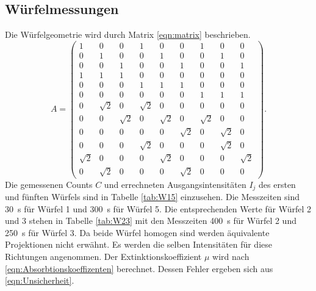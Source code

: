 \subsection{Würfelmessungen}
Die Würfelgeometrie wird durch Matrix \eqref{eqn:matrix} beschrieben.
\begin{equation*}
    A = \begin{pmatrix}
               1 & 0 & 0 & 1 & 0 & 0 & 1 & 0 & 0 \\
               0 & 1 & 0 & 0 & 1 & 0 & 0 & 1 & 0 \\
               0 & 0 & 1 & 0 & 0 & 1 & 0 & 0 & 1 \\
               1 & 1 & 1 & 0 & 0 & 0 & 0 & 0 & 0 \\
               0 & 0 & 0 & 1 & 1 & 1 & 0 & 0 & 0 \\
               0 & 0 & 0 & 0 & 0 & 0 & 1 & 1 & 1 \\
               0 & \sqrt{2} & 0 & \sqrt{2} & 0 & 0 & 0 & 0 & 0 \\
               0 & 0 & \sqrt{2} & 0 & \sqrt{2} & 0 & \sqrt{2} & 0 & 0 \\
               0 & 0 & 0 & 0 & 0 & \sqrt{2} & 0 & \sqrt{2} & 0 \\
               0 & 0 & 0 & \sqrt{2} & 0 & 0 & 0 & \sqrt{2} & 0 \\
               \sqrt{2} & 0 & 0 & 0 & \sqrt{2} & 0 & 0 & 0 & \sqrt{2} \\
               0 & \sqrt{2} & 0 & 0 & 0 & \sqrt{2} & 0 & 0 & 0
       \end{pmatrix}.
       \label{eqn:matrix}
  \end{equation*}
Die gemessenen Counts $C$ und errechneten Ausgangsintensitäten $I_j$ des ersten und fünften Würfels sind in Tabelle \ref{tab:W15} einzusehen.
Die Messzeiten sind \SI{30}{\second} für Würfel 1 und \SI{300}{\second} für Würfel 5.
Die entsprechenden Werte für Würfel 2 und 3 stehen in Tabelle \ref{tab:W23} mit den Messzeiten \SI{400}{\second} für Würfel 2 und \SI{250}{\second} für Würfel 3.
Da beide Würfel homogen sind werden äquivalente Projektionen nicht erwähnt.
Es werden die selben Intensitäten für diese Richtungen angenommen.
Der Extinktionskoeffizient $\mu$ wird nach \eqref{eqn:Absorbtionskoeffizenten} berechnet.
Dessen Fehler ergeben sich aus \eqref{eqn:Unsicherheit}.
